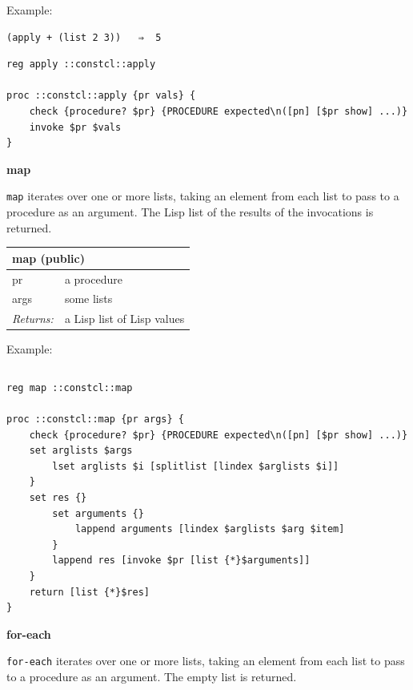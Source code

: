 \documentclass[twoside,9pt]{report}
\begin{document}
Example:

\noindent\makebox[\linewidth]{\rule{\linewidth}{0.4pt}}
\begin{lstlisting}
(apply + (list 2 3))   ⇒  5
\end{lstlisting}
\noindent\makebox[\linewidth]{\rule{\linewidth}{0.4pt}}
\noindent\makebox[\linewidth]{\rule{\linewidth}{0.4pt}}
\begin{lstlisting}
reg apply ::constcl::apply
 
proc ::constcl::apply {pr vals} {
    check {procedure? $pr} {PROCEDURE expected\n([pn] [$pr show] ...)}
    invoke $pr $vals
}
\end{lstlisting}
\noindent\makebox[\linewidth]{\rule{\linewidth}{0.4pt}}

\textbf{map}


\texttt{map} iterates over one or more lists, taking an element from each list to pass to a procedure as an argument. The Lisp list of the results of the invocations is returned.

\begin{tabular}{ |l l| }
\hline
\multicolumn{2}{|l|}{map (public)} \\
\hline
pr & a procedure \\
args & some lists \\
\textit{Returns:} & a Lisp list of Lisp values \\
\hline
\end{tabular}


Example:

\noindent\makebox[\linewidth]{\rule{\linewidth}{0.4pt}}
\begin{lstlisting}
\end{lstlisting}
\noindent\makebox[\linewidth]{\rule{\linewidth}{0.4pt}}
\noindent\makebox[\linewidth]{\rule{\linewidth}{0.4pt}}
\begin{lstlisting}
reg map ::constcl::map
 
proc ::constcl::map {pr args} {
    check {procedure? $pr} {PROCEDURE expected\n([pn] [$pr show] ...)}
    set arglists $args
        lset arglists $i [splitlist [lindex $arglists $i]]
    }
    set res {}
        set arguments {}
            lappend arguments [lindex $arglists $arg $item]
        }
        lappend res [invoke $pr [list {*}$arguments]]
    }
    return [list {*}$res]
}
\end{lstlisting}
\noindent\makebox[\linewidth]{\rule{\linewidth}{0.4pt}}

\textbf{for-each}


\texttt{for-each} iterates over one or more lists, taking an element from each list to pass to a procedure as an argument. The empty list is returned.
\end{document}

